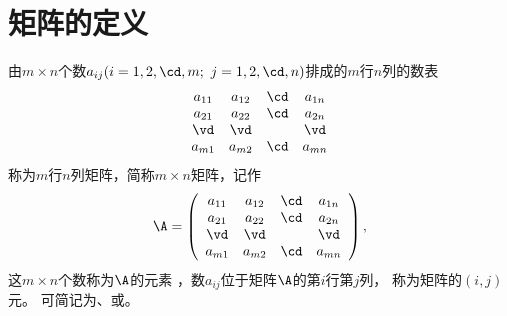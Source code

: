 \section{矩阵的定义}
\begin{dingyi}
  由$m\times n$个数$a_{ij}(i=1,2,\cd,m; \ j = 1, 2, \cd, n)$排成的$m$行$n$列的数表
  $$
  \begin{array}{cccc}
    a_{11} & a_{12} & \cd & a_{1n}\\
    a_{21} & a_{22} & \cd & a_{2n}\\
    \vd    & \vd   &     & \vd \\
    a_{m1} & a_{m2} & \cd & a_{mn}\\
  \end{array}
  $$
  称为$m$行$n$列矩阵，简称$m \times n$矩阵，记作
  $$
  {\A} = \left(
    \begin{array}{cccc}
      a_{11} & a_{12} & \cd & a_{1n}\\
      a_{21} & a_{22} & \cd & a_{2n}\\
      \vd    & \vd   &     & \vd \\
      a_{m1} & a_{m2} & \cd & a_{mn}\\
    \end{array}
  \right),
  $$
  这$m \times n$个数称为$\A$的元素
  ，数$a_{ij}$位于矩阵$\A$的第$i$行第$j$列，
  称为矩阵的$(i,j)$元。 可简记为、或。
\end{dingyi}

